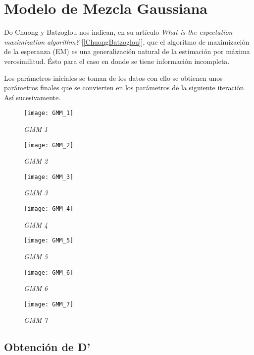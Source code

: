 \section{Modelo de Mezcla Gaussiana} \label{sec_GMM}

Do Chuong y Batzoglou nos indican, en su artículo \textit{What is the expectation maximization algorithm?} [\ref{ChuongBatzoglou}], que el algoritmo de maximización de la esperanza (EM) es una generalización natural de la estimación por máxima verosimilitud. Ésto para el caso en donde se tiene información incompleta.

Los parámetros iniciales se toman de los datos con ello se obtienen unos parámetros finales que se convierten en los parámetros de la siguiente iteración. Así sucesivamente.


\begin{figure}[H]
\centering
\texttt{[image: GMM\_1]} %
\caption{\textit{GMM 1}}
\end{figure}

\begin{figure}[H]
\centering
\texttt{[image: GMM\_2]} %
\caption{\textit{GMM 2}}
\end{figure}

\begin{figure}[H]
\centering
\texttt{[image: GMM\_3]} %
\caption{\textit{GMM 3}}
\end{figure}

\begin{figure}[H]
\centering
\texttt{[image: GMM\_4]} %
\caption{\textit{GMM 4}}
\end{figure}

\begin{figure}[H]
\centering
\texttt{[image: GMM\_5]} %
\caption{\textit{GMM 5}}
\end{figure}

\begin{figure}[H]
\centering
\texttt{[image: GMM\_6]} %
\caption{\textit{GMM 6}}
\end{figure}

\begin{figure}[H]
\centering
\texttt{[image: GMM\_7]} %
\caption{\textit{GMM 7}}
\end{figure}

\subsection{Obtención de D'}

